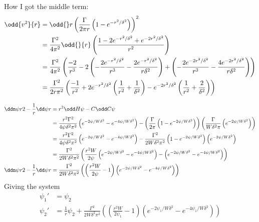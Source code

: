\documentclass{X:/Documents/Coding/Latex/myreport}
\begin{document}
How I got the middle term:
\begin{align*}
    \odd{v^2}{r} &= \odd{}r \left(\frac{\Gamma}{2\pi r} \left(1-e^{-r^2/\delta^2}\right)\right)^2\\
    &= \frac{\Gamma^2}{4\pi^2} \odd{}{r} \left(\frac{1 - 2e^{-r^2/\delta^2} + e^{-2r^2/\delta^2}}{r^2}\right)\\
    &= \frac{\Gamma^2}{4\pi^2} \left(\frac{-2}{r^3} -2\left(-\frac{2e^{-r^2/\delta^2}}{r^3} - \frac{2e^{-r^2/\delta^2}}{r\delta^2}\right) + \left(-\frac{2e^{-2r^2/\delta^2}}{r^3} - \frac{4e^{-2r^2/\delta^2}}{r \delta^2}\right)\right)\\
    &= \frac{\Gamma^2}{2r\pi^2} \left(\frac{-1}{r^2} +2e^{-r^2/\delta^2}\left(\frac{1}{r^2} + \frac{1}{\delta^2}\right) -e^{-2r^2/\delta^2} \left(\frac{1}{r^2} + \frac{2}{ \delta^2}\right)\right)
\end{align*}


\begin{align*}
    \ddn\psi r2 - \frac1r \dd\psi r &=  r^2 \odd H\psi - C \odd C\psi\\
    &=\frac{r^2\Gamma^2}{4\psi\delta^2\pi^2} \left(e^{-2\psi/W\delta^2} - e^{-4\psi/W\delta^2}\right) - \left(\frac{\Gamma}{2\pi} \left(1-e^{-2\psi/W\delta^2}\right)\right)\left(\frac{\Gamma}{W\delta^2\pi} \left(e^{-2\psi/W\delta^2}\right)\right)\\
    &=\frac{r^2\Gamma^2}{4\psi\delta^2\pi^2} \left(e^{-2\psi/W\delta^2} - e^{-4\psi/W\delta^2}\right) - \frac{\Gamma^2}{2W\delta^2\pi^2}\left(1-e^{-2\psi/W\delta^2}\right) \left(e^{-2\psi/W\delta^2}\right)\\
    &= \frac{\Gamma^2}{2W\delta^2\pi^2}\left(\frac{r^2W}{2\psi} \left(e^{-2\psi/W\delta^2} - e^{-4\psi/W\delta^2}\right) -\left(e^{-2\psi/W\delta^2}-e^{-4\psi/W\delta^2}\right)\right)\\
    \ddn\psi r2 - \frac1r \dd\psi r &=  \frac{\Gamma^2}{2W\delta^2\pi^2}\left(\left(\frac{r^2W}{2\psi} - 1\right) \left(e^{-2\psi/W\delta^2} - e^{-4\psi/W\delta^2}\right) \right)\\
\end{align*}
Giving the system
\begin{align*}
    \psi_1 ' &= \psi_2\\
    \psi_2' &= \frac1r \psi_2 + \frac{\Gamma^2}{2W\delta^2\pi^2}\left(\left(\frac{r^2W}{2\psi_1} - 1\right) \left(e^{-2\psi_1/W\delta^2} - e^{-4\psi_1/W\delta^2}\right) \right)\\
\end{align*}
\end{document}

